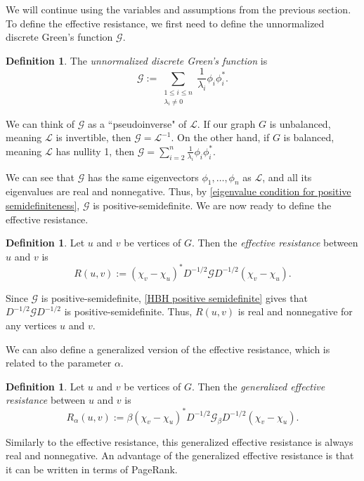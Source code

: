 \documentclass[12pt]{article}
\theoremstyle{definition}
\newtheorem{defn}[thm]{Definition}
\newcommand{\lap}{\mathcal{L}}
\newcommand{\green}{\mathcal{G}}
\begin{document}
We will continue using the variables and assumptions from the previous section. To define the effective resistance, we first need to define the unnormalized discrete Green's function $\green$.

\begin{defn}
The \textit{unnormalized discrete Green's function} is 
$$
\green := \sum_{\substack{1 \leq i \leq n \\ \lambda_i \neq 0}} \frac{1}{\lambda_i} \phi_i \phi_i^*.
$$
\end{defn}

We can think of $\green$ as a ``pseudoinverse" of $\lap$. If our graph $G$ is unbalanced, meaning $\lap$ is invertible, then $\green = \lap^{-1}$. On the other hand, if $G$ is balanced, meaning $\lap$ has nullity 1, then $\green = \sum_{i=2}^{n} \frac{1}{\lambda_i} \phi_i \phi_i^*$. 

We can see that $\green$ has the same eigenvectors $\phi_1, \dots, \phi_n$ as $\lap$, and all its eigenvalues are real and nonnegative. Thus, by \cref{eigenvalue condition for positive semidefiniteness}, $\green$ is positive-semidefinite. We are now ready to define the effective resistance.

\begin{defn}
Let $u$ and $v$ be vertices of $G$. Then the \textit{effective resistance} between $u$ and $v$ is 
$$
R(u, v) := (\chi_v - \chi_u)^* D^{-1/2} \green D^{-1/2} (\chi_v - \chi_u).
$$
\end{defn}

Since $\green$ is positive-semidefinite, \cref{HBH positive semidefinite} gives that $D^{-1/2} \green D^{-1/2}$ is positive-semidefinite. Thus, $R(u, v)$ is real and nonnegative for any vertices $u$ and $v$.

We can also define a generalized version of the effective resistance, which is related to the parameter $\alpha$.

\begin{defn}
Let $u$ and $v$ be vertices of $G$. Then the \textit{generalized effective resistance} between $u$ and $v$ is 
$$
R_\alpha(u, v) := \beta (\chi_v - \chi_u)^* D^{-1/2} \green_\beta D^{-1/2} (\chi_v - \chi_u).
$$
\end{defn}

Similarly to the effective resistance, this generalized effective resistance is always real and nonnegative. An advantage of the generalized effective resistance is that it can be written in terms of PageRank.
\end{document}
